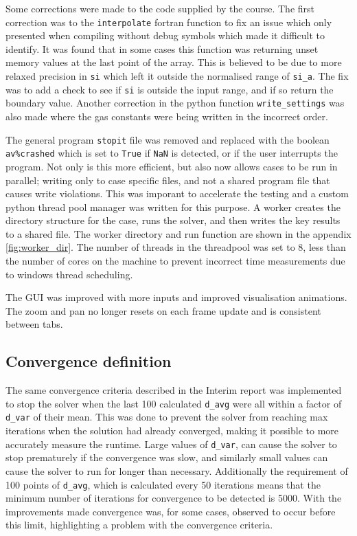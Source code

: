 \documentclass{article}
\begin{document}
Some corrections were made to the code supplied by the course.
The first correction was to the \texttt{interpolate} fortran function to fix an issue which only presented when compiling without debug symbols which made it difficult to identify.
It was found that in some cases this function was returning unset memory values at the last point of the array. This is believed to be due to more relaxed precision in \texttt{si} which left it outside the normalised range of \texttt{si\_a}.
The fix was to add a check to see if \texttt{si} is outside the input range, and if so return the boundary value.
Another correction in the python function \texttt{write\_settings} was also made where the gas constants were being written in the incorrect order.

The general program \texttt{stopit} file was removed and replaced with the boolean \texttt{av\%crashed} which is set to \texttt{True} if \texttt{NaN} is detected, or if the user interrupts the program.
Not only is this more efficient, but also now allows cases to be run in parallel; writing only to case specific files, and not a shared program file that causes write violations.
This was imporant to accelerate the testing and a custom python thread pool manager was written for this purpose.
A worker creates the directory structure for the case, runs the solver, and then writes the key results to a shared file.
The worker directory and run function are shown in the appendix \ref{fig:worker_dir}.
The number of threads in the threadpool was set to 8, less than the number of cores on the machine to prevent incorrect time measurements due to windows thread scheduling.

The GUI was improved with more inputs and improved visualisation animations.
The zoom and pan no longer resets on each frame update and is consistent between tabs.

\subsection{Convergence definition}

The same convergence criteria described in the Interim report \cite{interim} was implemented to stop the solver when the last 100 calculated \texttt{d\_avg} were all within a factor of \texttt{d\_var} of their mean.
This was done to prevent the solver from reaching max iterations when the solution had already converged, making it possible to more accurately measure the runtime.
Large values of \texttt{d\_var}, can cause the solver to stop prematurely if the convergence was slow, and similarly small values
can cause the solver to run for longer than necessary.
Additionally the requirement of 100 points of \texttt{d\_avg}, which is calculated every 50 iterations means that the minimum number of iterations for convergence to be detected is 5000.
With the improvements made convergence was, for some cases, observed to occur before this limit, highlighting a problem with the convergence criteria.
\end{document}
